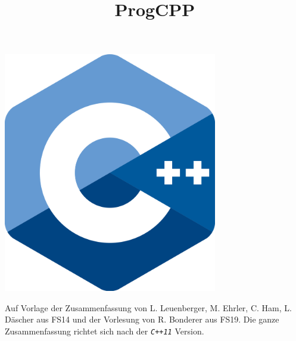 \usepackage{listings}

\usepackage{tikz}
\usepackage{pgf-umlcd}

\usepackage{courier}

\newcommand{\verweisc}[1]{$_{\textcolor{red}{\mbox{\small{C Kap. #1}}}}$}
\newcommand{\verweiscpp}[1]{$_{\textcolor{blue}{\mbox{\small{C++ Kap. #1}}}}$}
\newcommand{\verweisboth}[2]{$_{\textcolor{red}{\mbox{\small{C Kap. #1}}}}$$_{\textcolor{black}{\mbox{\small{, }}}}$$_{\textcolor{blue}{\mbox{\small{C++ Kap. #2}}}}$}
\newcommand{\verweishoch}[1]{${\textcolor{red}{\mbox{\small{Kapitel #1}}}}$}
\newcommand{\lc}[1]{\textit{\texttt{#1}}}

	

	\title{\fontsize{50}{60}\selectfont ProgCPP}
	\maketitle
	\thispagestyle{empty}	%
	\vspace*{0.5cm}
	\begin{center}
		\includegraphics*[width=0.7\textwidth]{pics/2000px-ISO_C++_Logo.png}
	\end{center}
	\vspace*{2cm}
	Auf Vorlage der Zusammenfassung von L. Leuenberger, M. Ehrler, C. Ham, L. Däscher aus FS14 und der Vorlesung von R. Bonderer aus FS19. Die ganze Zusammenfassung richtet sich nach der \lc{C++11} Version.
	\newpage
	\setcounter{tocdepth}{2}
	\tableofcontents
	\newpage
	\raggedbottom
	\lstset{style=cpp}

